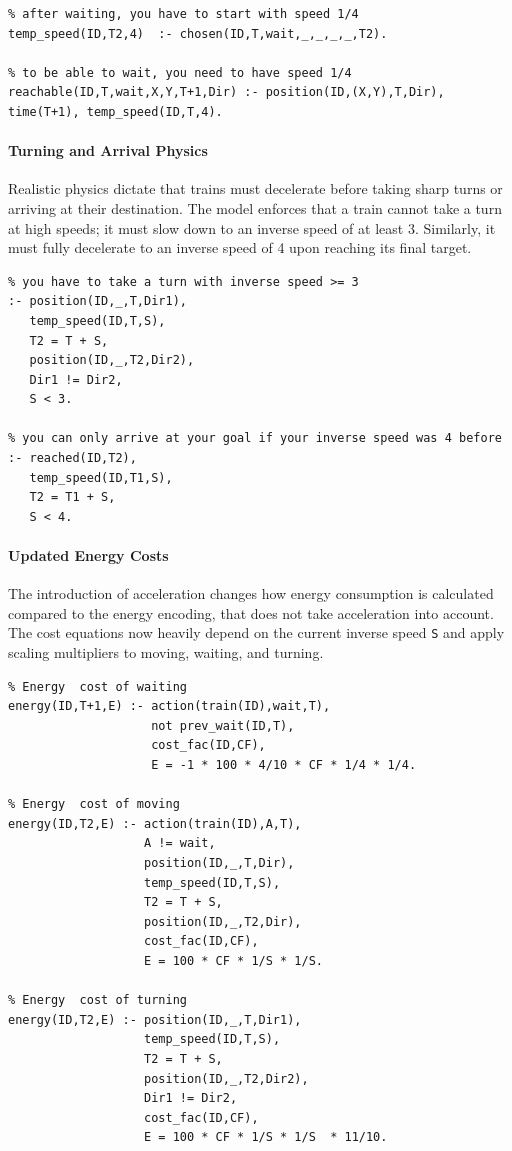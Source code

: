 \documentclass[12pt, a4paper]{llncs}
\begin{document}
\begin{verbatim}
% after waiting, you have to start with speed 1/4
temp_speed(ID,T2,4)  :- chosen(ID,T,wait,_,_,_,_,T2).

% to be able to wait, you need to have speed 1/4
reachable(ID,T,wait,X,Y,T+1,Dir) :- position(ID,(X,Y),T,Dir), time(T+1), temp_speed(ID,T,4).
\end{verbatim}

\paragraph{Turning and Arrival Physics}
Realistic physics dictate that trains must decelerate before taking sharp turns or arriving at their destination. The model enforces that a train cannot take a turn at high speeds; it must slow down to an inverse speed of at least 3. Similarly, it must fully decelerate to an inverse speed of 4 upon reaching its final target.

\begin{verbatim}
% you have to take a turn with inverse speed >= 3 
:- position(ID,_,T,Dir1),
   temp_speed(ID,T,S),
   T2 = T + S,
   position(ID,_,T2,Dir2),
   Dir1 != Dir2,
   S < 3.

% you can only arrive at your goal if your inverse speed was 4 before
:- reached(ID,T2),
   temp_speed(ID,T1,S),
   T2 = T1 + S,
   S < 4.
\end{verbatim}

\paragraph{Updated Energy Costs}
The introduction of acceleration changes how energy consumption is calculated compared to the energy encoding, that does not take acceleration into account. The cost equations now heavily depend on the current inverse speed \texttt{S} and apply scaling multipliers to moving, waiting, and turning.

\begin{verbatim}
% Energy  cost of waiting
energy(ID,T+1,E) :- action(train(ID),wait,T),
                    not prev_wait(ID,T),
                    cost_fac(ID,CF),
                    E = -1 * 100 * 4/10 * CF * 1/4 * 1/4.

% Energy  cost of moving
energy(ID,T2,E) :- action(train(ID),A,T),
                   A != wait,
                   position(ID,_,T,Dir),
                   temp_speed(ID,T,S),
                   T2 = T + S,
                   position(ID,_,T2,Dir),
                   cost_fac(ID,CF),
                   E = 100 * CF * 1/S * 1/S.

% Energy  cost of turning
energy(ID,T2,E) :- position(ID,_,T,Dir1),
                   temp_speed(ID,T,S),
                   T2 = T + S,
                   position(ID,_,T2,Dir2),
                   Dir1 != Dir2,
                   cost_fac(ID,CF),
                   E = 100 * CF * 1/S * 1/S  * 11/10.
\end{verbatim}
\end{document}
